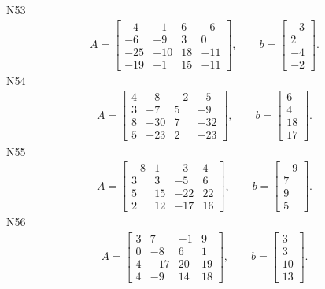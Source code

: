 \documentclass[11pt]{report}
\begin{document}
N53
\begin{align*}
 A = \left[\begin{matrix}-4 & -1 & 6 & -6\\-6 & -9 & 3 & 0\\-25 & -10 & 18 & -11\\-19 & -1 & 15 & -11\end{matrix}\right],
\qquad b = \left[\begin{matrix}-3\\2\\-4\\-2\end{matrix}\right]. 
 \end{align*}
N54
\begin{align*}
 A = \left[\begin{matrix}4 & -8 & -2 & -5\\3 & -7 & 5 & -9\\8 & -30 & 7 & -32\\5 & -23 & 2 & -23\end{matrix}\right],
\qquad b = \left[\begin{matrix}6\\4\\18\\17\end{matrix}\right]. 
 \end{align*}
N55
\begin{align*}
 A = \left[\begin{matrix}-8 & 1 & -3 & 4\\3 & 3 & -5 & 6\\5 & 15 & -22 & 22\\2 & 12 & -17 & 16\end{matrix}\right],
\qquad b = \left[\begin{matrix}-9\\7\\9\\5\end{matrix}\right]. 
 \end{align*}
N56
\begin{align*}
 A = \left[\begin{matrix}3 & 7 & -1 & 9\\0 & -8 & 6 & 1\\4 & -17 & 20 & 19\\4 & -9 & 14 & 18\end{matrix}\right],
\qquad b = \left[\begin{matrix}3\\3\\10\\13\end{matrix}\right]. 
 \end{align*}
\end{document}
